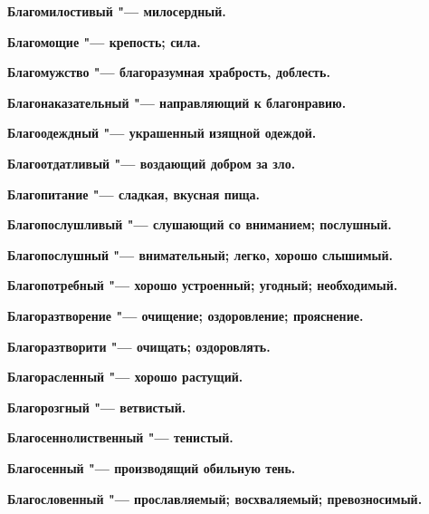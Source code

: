 \bfseries Благомилостивый \normalfont{} "--- милосердный. 




\bfseries Благомощие \normalfont{} "--- крепость; сила. 




\bfseries Благомужство \normalfont{} "--- благоразумная храбрость, доблесть. 




\bfseries Благонаказательный \normalfont{} "--- направляющий к благонравию. 




\bfseries Благоодеждный \normalfont{} "--- украшенный изящной одеждой. 




\bfseries Благоотдатливый \normalfont{} "--- воздающий добром за зло. 




\bfseries Благопитание \normalfont{} "--- сладкая, вкусная пища. 




\bfseries Благопослушливый \normalfont{} "--- слушающий со вниманием; послушный. 




\bfseries Благопослушный \normalfont{} "--- внимательный; легко, хорошо слышимый. 




\bfseries Благопотребный \normalfont{} "--- хорошо устроенный; угодный; необходимый. 




\bfseries Благоразтворение \normalfont{} "--- очищение; оздоровление; прояснение. 




\bfseries Благоразтворити \normalfont{} "--- очищать; оздоровлять. 




\bfseries Благорасленный \normalfont{} "--- хорошо растущий. 




\bfseries Благорозгный \normalfont{} "--- ветвистый. 




\bfseries Благосеннолиственный \normalfont{} "--- тенистый. 




\bfseries Благосенный \normalfont{} "--- производящий обильную тень. 




\bfseries Благословенный \normalfont{} "--- прославляемый; восхваляемый; превозносимый. 




